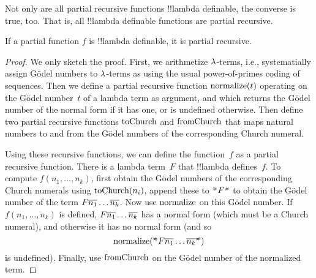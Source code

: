 \documentclass[../../../include/open-logic-section]{subfiles}
\begin{document}

Not only are all partial recursive functions !!{lambda definable}, the
converse is true, too. That is, all !!{lambda definable} functions are
partial recursive.

\begin{thm}
   If a partial function $f$ is
  !!{lambda definable}, it is partial recursive.
\end{thm}

\begin{proof}
  We only sketch the proof. First, we arithmetize $\lambd$-terms,
  i.e., systematially assign G\"odel numbers to $\lambd$-terms as
  using the usual power-of-primes coding of sequences.  Then we define
  a partial recursive function $\mathrm{normalize}(t)$ operating on the
  G\"odel number~$t$ of a lambda term as argument, and which returns
  the G\"odel number of the normal form if it has one, or is undefined
  otherwise.  Then define two partial recursive functions
  $\mathrm{toChurch}$ and $\mathrm{fromChurch}$ that maps natural numbers to
  and from the G\"odel numbers of the corresponding Church numeral.

  Using these recursive functions, we can define the function~$f$ as a
  partial recursive function. There is a lambda term~$F$ that
  !!{lambda define}s~$f$. To compute $f(n_1, \dots, n_k)$, first obtain
  the G\"odel numbers of the corresponding Church numerals using
  $\mathrm{toChurch}(n_i)$, append these to $\Gn{F}$ to obtain the G\"odel
  number of the term $F \overline{n_1}\dots\overline{n_k}$. Now use
  $\mathrm{normalize}$ on this G\"odel number. If $f(n_1, \dots, n_k)$ is
  defined, $F \overline{n_1}\dots\overline{n_k}$ has a normal form (which must
  be a Church numeral), and otherwise it has no normal form (and so
  \[\fn{normalize}(\Gn{F\num{n_1}\dots\num{n_k}})\] is undefined).
  Finally, use $\mathrm{fromChurch}$ on the G\"odel number of the
  normalized term.
\end{proof}
\end{document}
